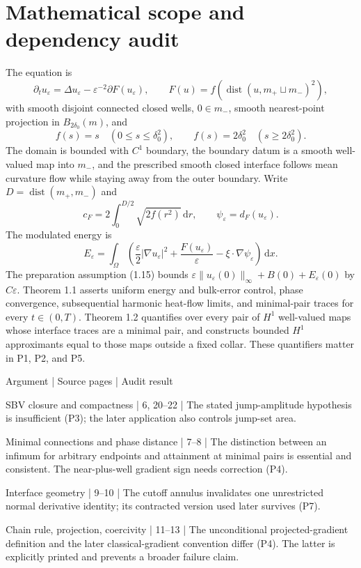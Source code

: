 \documentclass[10pt]{article}
\begin{document}
\section*{Mathematical scope and dependency audit}
The equation is \[\partial_tu_\varepsilon=\Delta u_\varepsilon-\varepsilon^{-2}\partial F(u_\varepsilon),
 \qquad F(u)=f(\operatorname{dist}(u,m_+\sqcup m_-)^2),\] with smooth disjoint connected closed wells, \(0\in m_-\), smooth nearest-point projection in \(B_{2\delta_0}(m)\), and \[f(s)=s\quad(0\leq s\leq\delta_0^2),\qquad
 f(s)=2\delta_0^2\quad(s\geq2\delta_0^2).\] The domain is bounded with \(C^1\) boundary, the boundary datum is a smooth well-valued map into \(m_-\), and the prescribed smooth closed interface follows mean curvature flow while staying away from the outer boundary. Write \(D=\operatorname{dist}(m_+,m_-)\) and \[c_F=2\int_0^{D/2}\sqrt{2f(r^2)}\,\mathrm dr,\qquad
 \psi_\varepsilon=d_F(u_\varepsilon).\] The modulated energy is \[E_\varepsilon=\int_\Omega
 \left(\frac{\varepsilon}{2}|\nabla u_\varepsilon|^2+
       \frac{F(u_\varepsilon)}{\varepsilon}-\xi\cdot\nabla\psi_\varepsilon\right)\,\mathrm dx.\] The preparation assumption (1.15) bounds \(\varepsilon\|u_\varepsilon(0)\|_\infty+B(0)+E_\varepsilon(0)\) by \(C\varepsilon\). Theorem 1.1 asserts uniform energy and bulk-error control, phase convergence, subsequential harmonic heat-flow limits, and minimal-pair traces for every \(t\in(0,T)\). Theorem 1.2 quantifies over every pair of \(H^1\) well-valued maps whose interface traces are a minimal pair, and constructs bounded \(H^1\) approximants equal to those maps outside a fixed collar. These quantifiers matter in P1, P2, and P5.\par
Argument | Source pages | Audit result\par
SBV closure and compactness | 6, 20–22 | The stated jump-amplitude hypothesis is insufficient (P3); the later application also controls jump-set area.\par
Minimal connections and phase distance | 7–8 | The distinction between an infimum for arbitrary endpoints and attainment at minimal pairs is essential and consistent. The near-plus-well gradient sign needs correction (P4).\par
Interface geometry | 9–10 | The cutoff annulus invalidates one unrestricted normal derivative identity; its contracted version used later survives (P7).\par
Chain rule, projection, coercivity | 11–13 | The unconditional projected-gradient definition and the later classical-gradient convention differ (P4). The latter is explicitly printed and prevents a broader failure claim.\par
\end{document}
